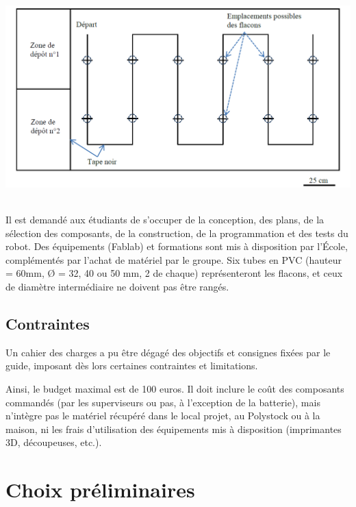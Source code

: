 \documentclass[a4paper,11pt]{article}
\begin{document}
\begin{center}
    \includegraphics[height=80mm]{schema_circuit.png}
\end{center}    

Il est demandé aux étudiants de s'occuper de la conception, des plans, de la sélection des composants, de la construction, de la programmation et des tests du robot. Des équipements (Fablab) et formations sont mis à disposition par l'École, complémentés par l'achat de matériel par le groupe. Six tubes en PVC (hauteur = 60mm, Ø = 32, 40 ou 50 mm, 2 de chaque) représenteront les flacons, et ceux de diamètre intermédiaire ne doivent pas être rangés.

\subsection{Contraintes}

Un cahier des charges a pu être dégagé des objectifs et consignes fixées par le guide, imposant dès lors certaines contraintes et limitations.

Ainsi, le budget maximal est de 100 euros. Il doit inclure le coût des composants commandés (par les superviseurs ou pas, à l'exception de la batterie), mais n'intègre pas le matériel récupéré dans le local projet, au Polystock ou à la maison, ni les frais d'utilisation des équipements mis à disposition (imprimantes 3D, découpeuses, etc.).


\section{\label{sec:choix}Choix préliminaires} %
\end{document}
